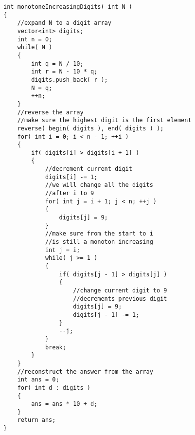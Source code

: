 \setcounter{lstlisting}{0}
\begin{lstlisting}[style=customc, caption={Greedy}]
int monotoneIncreasingDigits( int N )
{
    //expand N to a digit array
    vector<int> digits;
    int n = 0;
    while( N )
    {
        int q = N / 10;
        int r = N - 10 * q;
        digits.push_back( r );
        N = q;
        ++n;
    }
    //reverse the array
    //make sure the highest digit is the first element
    reverse( begin( digits ), end( digits ) );
    for( int i = 0; i < n - 1; ++i )
    {
        if( digits[i] > digits[i + 1] )
        {
            //decrement current digit
            digits[i] -= 1;
            //we will change all the digits
            //after i to 9
            for( int j = i + 1; j < n; ++j )
            {
                digits[j] = 9;
            }
            //make sure from the start to i
            //is still a monoton increasing
            int j = i;
            while( j >= 1 )
            {
                if( digits[j - 1] > digits[j] )
                {
                    //change current digit to 9
                    //decrements previous digit
                    digits[j] = 9;
                    digits[j - 1] -= 1;
                }
                --j;
            }
            break;
        }
    }
    //reconstruct the answer from the array
    int ans = 0;
    for( int d : digits )
    {
        ans = ans * 10 + d;
    }
    return ans;
}
\end{lstlisting}